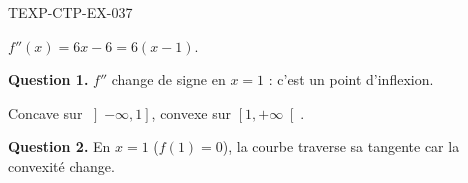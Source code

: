 \begin{corrige}{TEXP-CTP-EX-037}

$f''(x) = 6x - 6 = 6(x-1)$.


\textbf{Question 1.} $f''$ change de signe en $x = 1$ : c'est un point d'inflexion.

Concave sur $\left]-\infty, 1\right]$, convexe sur $\left[1, +\infty\right[$.

\textbf{Question 2.} En $x = 1$ ($f(1) = 0$), la courbe traverse sa tangente car la convexité change.

\end{corrige}
